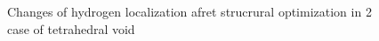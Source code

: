 \begin{figure}[h]
\begin{minipage}[h]{0.49\linewidth}
\end{minipage}
\hfill
\begin{minipage}[h]{0.49\linewidth}
\end{minipage}
\caption{Changes of hydrogen localization afret strucrural optimization in 2 case of tetrahedral void}
\label{ris:tet2}
\end{figure}

